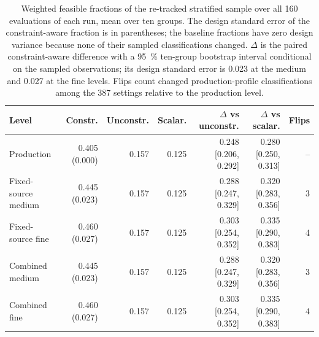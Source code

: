 \begin{table}[htbp]
\centering
\caption{Weighted feasible fractions of the re-tracked stratified sample over all 160
evaluations of each run, mean over ten groups. The design standard error of the constraint-aware
fraction is in parentheses; the baseline fractions have zero design variance because none of
their sampled classifications changed. $\Delta$ is the paired constraint-aware difference with a
\SI{95}{\percent} ten-group bootstrap interval conditional on the sampled observations; its
design standard error is 0.023 at the medium and 0.027 at the fine levels. Flips count changed
production-profile classifications among the 387 settings relative to the production level.}
\label{tab:retracking}
\footnotesize
\setlength{\tabcolsep}{4pt}
\begin{tabular}{lrrrrrr}
\toprule
Level & Constr. & Unconstr. & Scalar. & $\Delta$ vs unconstr. & $\Delta$ vs scalar. & Flips \\
\midrule
Production & 0.405 (0.000) & 0.157 & 0.125 & 0.248 [0.206, 0.292] & 0.280 [0.250, 0.313] & -- \\
Fixed-source medium & 0.445 (0.023) & 0.157 & 0.125 & 0.288 [0.247, 0.329] & 0.320 [0.283, 0.356] & 3 \\
Fixed-source fine & 0.460 (0.027) & 0.157 & 0.125 & 0.303 [0.254, 0.352] & 0.335 [0.290, 0.383] & 4 \\
Combined medium & 0.445 (0.023) & 0.157 & 0.125 & 0.288 [0.247, 0.329] & 0.320 [0.283, 0.356] & 3 \\
Combined fine & 0.460 (0.027) & 0.157 & 0.125 & 0.303 [0.254, 0.352] & 0.335 [0.290, 0.383] & 4 \\
\bottomrule
\end{tabular}
\end{table}
